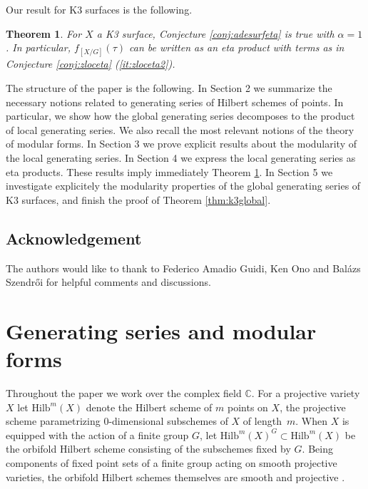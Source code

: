 \documentclass[11pt,a4paper]{amsart}
\newtheorem{theorem}{Theorem}[section]
\theoremstyle{definition}
\newcommand{\SC}{\mathbb{C}}                    %
\begin{document}
Our result for K3 surfaces is the following.
\begin{theorem}\label{thm:k3eta}	
For $X$ a K3 surface, Conjecture \ref{conj:adesurfeta} is true with $\alpha=1$. In particular, $f_{[X/G]}(\tau)$ can be written as an eta product with terms as in Conjecture \ref{conj:zloceta} (\ref{it:zloceta2}).
\end{theorem}

The structure of the paper is the following. In Section 2 we summarize the necessary notions related to generating series of Hilbert schemes of points. In particular, we show how the global generating series decomposes to the product of local generating series. We also recall the most relevant notions of the theory of modular forms. In Section 3 we prove explicit results about the modularity of the local generating series. In Section 4 we express the local generating series as eta products. These results imply immediately Theorem \ref{thm:k3eta}. In Section 5 we investigate explicitely the modularity properties of the global generating series of K3 surfaces, and finish the proof of Theorem \ref{thm:k3global}.

\subsection*{Acknowledgement} The authors would like to thank to Federico Amadio Guidi, Ken Ono and Bal\'azs Szendr\H{o}i  for helpful comments and discussions.

\section{Generating series and modular forms}
\label{sec:genseries}

Throughout the paper we work over the complex field $\SC$. For a projective variety $X$ let $\mathrm{Hilb}^m(X)$ denote the Hilbert scheme of $m$ points on $X$, the projective scheme parametrizing $0$-dimensional subschemes of $X$ of length~$m$. When $X$ is equipped with the action of a finite group $G$, let $\mathrm{Hilb}^m(X)^G \subset \mathrm{Hilb}^m(X)$ be the orbifold Hilbert scheme consisting of the subschemes fixed by $G$.
%
Being components of fixed point sets of a finite group acting on smooth projective varieties, the orbifold Hilbert schemes themselves are smooth and projective \cite{cartan1957quotient}. 
\end{document}
